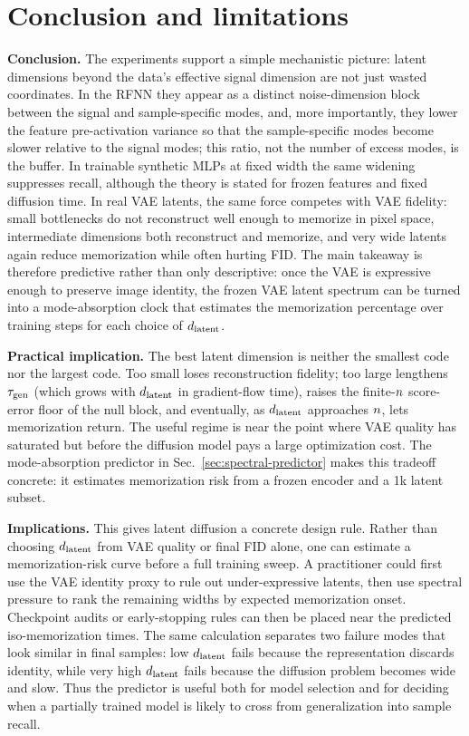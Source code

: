 \section{Conclusion and limitations}
\label{sec:discussion}

\textbf{Conclusion.}
The experiments support a simple mechanistic picture: latent
dimensions beyond the data's effective signal dimension are not
just wasted coordinates. In the RFNN they appear as a distinct noise-dimension block between the signal and sample-specific modes, and, more importantly, they lower the feature pre-activation variance so that the sample-specific modes become slower relative to the signal modes; this ratio, not the number of excess modes, is the buffer. In trainable synthetic MLPs at fixed width the same widening suppresses recall, although the theory is stated for frozen features and fixed diffusion time. In real VAE latents,
the same force competes with VAE fidelity: small bottlenecks do not
reconstruct well enough to memorize in pixel space, intermediate
dimensions both reconstruct and memorize, and very wide latents
again reduce memorization while often hurting FID. The main
takeaway is therefore predictive rather than only descriptive: once
the VAE is expressive enough to preserve image identity, the frozen
VAE latent spectrum can be turned into a mode-absorption clock that
estimates the memorization percentage over training steps for each
choice of $d_{\mathrm{latent}}$.

\textbf{Practical implication.}
The best latent dimension is neither the smallest code nor the
largest code. Too small loses reconstruction fidelity; too large lengthens $\tau_{\mathrm{gen}}$ (which grows with $d_{\mathrm{latent}}$ in gradient-flow time), raises the finite-$n$ score-error floor of the null block, and eventually, as $d_{\mathrm{latent}}$ approaches $n$, lets memorization return. The useful regime is near the point
where VAE quality has saturated but before the diffusion model pays a
large optimization cost. The mode-absorption predictor in
Sec.~\ref{sec:spectral-predictor} makes this tradeoff concrete:
it estimates memorization risk from a frozen encoder and a 1k latent
subset.

\textbf{Implications.}
This gives latent diffusion a concrete design rule. Rather than
choosing $d_{\mathrm{latent}}$ from VAE quality or final FID alone, one
can estimate a memorization-risk curve before a full training sweep.
A practitioner could first use the VAE identity proxy to rule out
under-expressive latents, then use spectral pressure to rank the
remaining widths by expected memorization onset. Checkpoint audits or
early-stopping rules can then be placed near the predicted
iso-memorization times. The same calculation separates two failure
modes that look similar in final samples: low $d_{\mathrm{latent}}$ fails because
the representation discards identity, while very high $d_{\mathrm{latent}}$ fails
because the diffusion problem becomes wide and slow. Thus the
predictor is useful both for model selection and for deciding when a
partially trained model is likely to cross from generalization into
sample recall.

